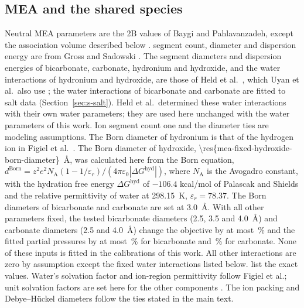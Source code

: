 \documentclass[a4paper,11pt]{article}
\begin{document}
\subsection{MEA and the shared species}\label{sec:s-mea-species}
Neutral MEA parameters are the 2B values of Baygi and Pahlavanzadeh, except the association volume described below \cite{Baygi2015}.
\COtwo segment count, diameter and dispersion energy are from Gross and Sadowski \cite{Gross2001}.
The segment diameters and dispersion energies of bicarbonate, carbonate, hydronium and hydroxide, and the water interactions of hydronium and hydroxide, are those of Held et al.\ \cite{Held2014}, which Uyan et al.\ also use \cite{Uyan2015}; the water interactions of bicarbonate and carbonate are fitted to salt data (Section~\ref{sec:s-salt}).
Held et al.\ determined these water interactions with their own water parameters; they are used here unchanged with the water parameters of this work.
Ion segment count one and the diameter ties are modeling assumptions.
The Born diameter of hydronium is that of the hydrogen ion in Figiel et al.\ \cite{Figiel2025}.
The Born diameter of hydroxide, \SI{\res{mea-fixed-hydroxide-born-diameter}}{\angstrom}, was calculated here from the Born equation, $d^{\mathrm{Born}}=z^2e^2N_{\mathrm A}(1-1/\varepsilon_r)/(4\pi\varepsilon_0|\Delta G^{\mathrm{hyd}}|)$, where $N_{\mathrm A}$ is the Avogadro constant, with the hydration free energy $\Delta G^{\mathrm{hyd}}$ of $-106.4$ kcal/mol of Palascak and Shields \cite{palascakAccurateExperimentalValues2004} and the relative permittivity of water at \SI{298.15}{\kelvin}, $\varepsilon_r=78.37$.
The Born diameters of bicarbonate and carbonate are set at \SI{3.0}{\angstrom}.
With all other parameters fixed, the tested bicarbonate diameters (2.5, 3.5 and \SI{4.0}{\angstrom}) and carbonate diameters (2.5 and \SI{4.0}{\angstrom}) change the objective by at most \,\% and the fitted \COtwo partial pressures by at most \,\% for bicarbonate and \,\% for carbonate.
None of these inputs is fitted in the calibrations of this work.
All other interactions are zero by assumption except the fixed water interactions listed below.
 list the exact values.
Water's solvation factor and ion-region permittivity follow Figiel et al.; unit solvation factors are set here for the other components \cite{Figiel2025}.
The ion packing and Debye--H\"uckel diameters follow the ties stated in the main text.
\end{document}
